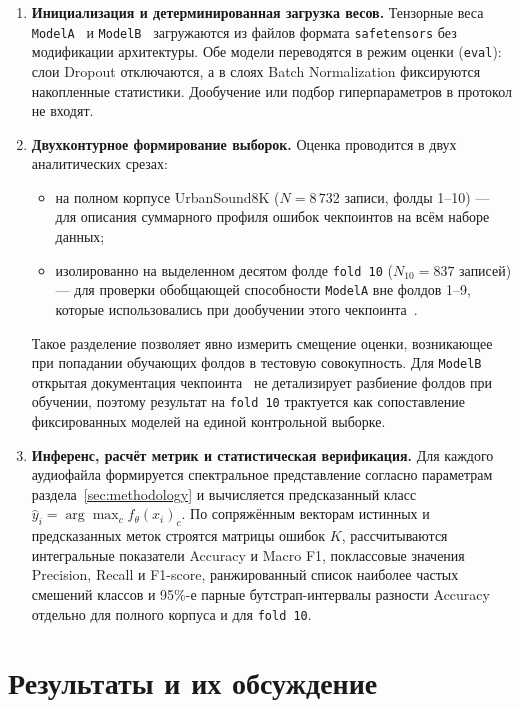 \documentclass[pdflatex,sn-mathphys-num]{sn-jnl}
\begin{document}
\begin{enumerate}
    \item \textbf{Инициализация и детерминированная загрузка весов.} Тензорные веса \texttt{ModelA}~\cite{ref14} и \texttt{ModelB}~\cite{ref15} загружаются из файлов формата \texttt{safetensors} без модификации архитектуры. Обе модели переводятся в режим оценки (\texttt{eval}): слои Dropout отключаются, а в слоях Batch Normalization фиксируются накопленные статистики. Дообучение или подбор гиперпараметров в протокол не входят.
    \item \textbf{Двухконтурное формирование выборок.} Оценка проводится в двух аналитических срезах:
    \begin{itemize}
        \item на полном корпусе UrbanSound8K ($N = 8\,732$ записи, фолды 1--10) --- для описания суммарного профиля ошибок чекпоинтов на всём наборе данных;
        \item изолированно на выделенном десятом фолде \texttt{fold 10} ($N_{10} = 837$ записей) --- для проверки обобщающей способности \texttt{ModelA} вне фолдов 1--9, которые использовались при дообучении этого чекпоинта~\cite{ref14}.
    \end{itemize}
    Такое разделение позволяет явно измерить смещение оценки, возникающее при попадании обучающих фолдов в тестовую совокупность. Для \texttt{ModelB} открытая документация чекпоинта~\cite{ref15} не детализирует разбиение фолдов при обучении, поэтому результат на \texttt{fold 10} трактуется как сопоставление фиксированных моделей на единой контрольной выборке.
    \item \textbf{Инференс, расчёт метрик и статистическая верификация.} Для каждого аудиофайла формируется спектральное представление согласно параметрам раздела~\ref{sec:methodology} и вычисляется предсказанный класс $\hat{y}_i = \arg\max_c f_{\theta}(x_i)_c$. По сопряжённым векторам истинных и предсказанных меток строятся матрицы ошибок $K$, рассчитываются интегральные показатели Accuracy и Macro F1, поклассовые значения Precision, Recall и F1-score, ранжированный список наиболее частых смешений классов и 95\%-е парные бутстрап-интервалы разности Accuracy отдельно для полного корпуса и для \texttt{fold 10}.
\end{enumerate}

\newpage
\section{Результаты и их обсуждение}\label{sec:results}
\end{document}
